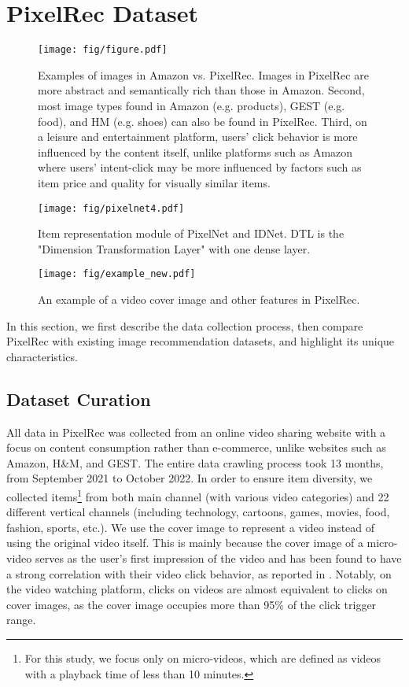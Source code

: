 \documentclass[sigconf]{acmart}
\begin{document}
	\section{PixelRec Dataset}
  \begin{figure*}[!t]
		\centering
		\texttt{[image: fig/figure.pdf]}
		\caption{Examples of images in Amazon vs. PixelRec.  Images in PixelRec are more abstract and semantically rich than those in Amazon. Second, most image types found in Amazon (e.g. products), GEST (e.g. food), and HM (e.g. shoes) can also be found in PixelRec. Third, on a leisure and entertainment platform, users' click behavior is more influenced by the content itself, unlike platforms such as Amazon where users' intent-click may be more influenced by factors such as item price and quality for visually similar items.}
		\label{fig:imagecompare}


	\end{figure*}
   \begin{figure}[t]
	\centering
		\texttt{[image: fig/pixelnet4.pdf]}
		\caption{Item representation module of PixelNet and IDNet. DTL is the "Dimension Transformation Layer" with one dense layer. 
}
\label{fig:pixelnet}
\end{figure}
 		\begin{figure}[t]
		\centering
		\texttt{[image: fig/example\_new.pdf]}
		\caption{An example of a video cover image and other features in PixelRec.}
		\label{fig:sample}
		
	\end{figure}

 In this section, we first describe the data collection process, then compare PixelRec with existing image recommendation datasets, and highlight its unique characteristics.
	\subsection{Dataset Curation}
	\label{datasetcollect}
All data in PixelRec was collected from an online video sharing website with a focus on content consumption  rather than e-commerce, unlike websites such as Amazon, H\&M, and GEST. The entire data crawling process took 13 months, from September 2021 to October 2022. In order to ensure item diversity, we  collected items\footnote{For this study, we focus only on micro-videos, which are defined as videos with a playback time of less than 10 minutes.} from  both main channel (with various video categories) and 22 different vertical channels (including technology, cartoons, games, movies, food, fashion, sports, etc.). 
 We use  the cover image to represent a video instead of using the original video itself. This is mainly because the cover image of a micro-video serves as the user's first impression of the video and  has been found  to have a strong correlation with their video click behavior, as reported in \cite{koh2022exploration,lee2017large,deldjoo2016content}. Notably, on the video watching platform, clicks on videos are almost equivalent to clicks on cover images, as the cover image occupies more than 95\% of the click trigger range. 
\end{document}
